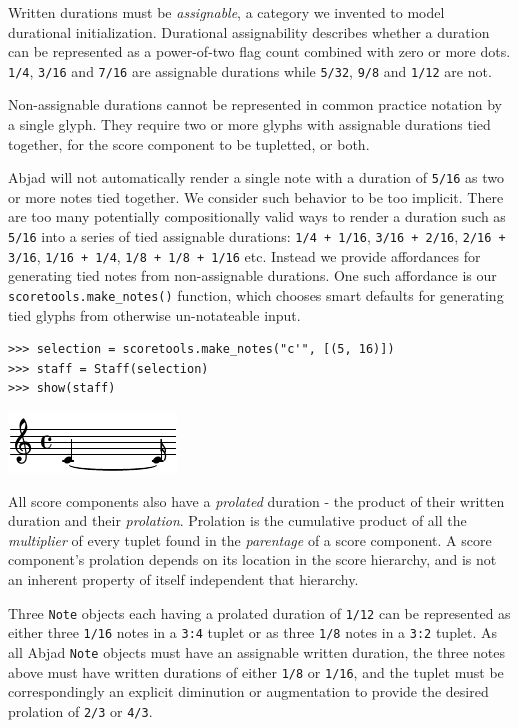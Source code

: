 Written durations must be \emph{assignable}, a category we invented to model
durational initialization. Durational assignability describes whether a
duration can be represented as a power-of-two flag count combined with zero or
more dots. \texttt{1/4}, \texttt{3/16} and \texttt{7/16} are assignable
durations while \texttt{5/32}, \texttt{9/8} and \texttt{1/12} are not.

Non-assignable durations cannot be represented in common practice notation by a
single glyph. They require two or more glyphs with assignable durations tied
together, for the score component to be tupletted, or both.

Abjad will not automatically render a single note with a duration of
\texttt{5/16} as two or more notes tied together. We consider such behavior to
be too implicit. There are too many potentially compositionally valid ways to
render a duration such as \texttt{5/16} into a series of tied assignable
durations: \texttt{1/4 + 1/16}, \texttt{3/16 + 2/16}, \texttt{2/16 + 3/16},
\texttt{1/16 + 1/4}, \texttt{1/8 + 1/8 + 1/16} etc. Instead we provide
affordances for generating tied notes from non-assignable durations. One such
affordance is our \texttt{scoretools.make\_notes()} function, which chooses
smart defaults for generating tied glyphs from otherwise un-notateable input.

\begin{lstlisting}
>>> selection = scoretools.make_notes("c'", [(5, 16)])
>>> staff = Staff(selection)
>>> show(staff)
\end{lstlisting}

\includegraphics[scale=1.0]{images/section_2_notational_isomorphism-3.pdf}


All score components also have a \emph{prolated} duration - the product of
their written duration and their \emph{prolation}. Prolation is the cumulative
product of all the \emph{multiplier} of every tuplet found in the
\emph{parentage} of a score component. A score component's prolation depends on
its location in the score hierarchy, and is not an inherent property of itself
independent that hierarchy.

Three \texttt{Note} objects each having a prolated duration of \texttt{1/12}
can be represented as either three \texttt{1/16} notes in a \texttt{3:4} tuplet
or as three \texttt{1/8} notes in a \texttt{3:2} tuplet. As all Abjad
\texttt{Note} objects must have an assignable written duration, the three notes
above must have written durations of either \texttt{1/8} or \texttt{1/16}, and
the tuplet must be correspondingly an explicit diminution or augmentation to
provide the desired prolation of \texttt{2/3} or \texttt{4/3}.

